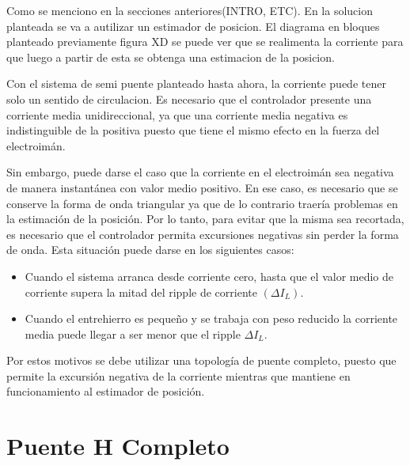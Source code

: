 Como se menciono en la secciones anteriores(INTRO, ETC). En la solucion planteada se va a autilizar un estimador de posicion. El diagrama en bloques planteado previamente figura XD se puede ver que se realimenta la corriente para que luego a partir de esta se obtenga una estimacion de la posicion.


Con el sistema de semi puente planteado hasta ahora, la corriente puede tener solo un sentido de circulacion. Es necesario que el controlador presente una corriente media unidireccional, ya que una corriente media negativa es indistinguible de la positiva puesto que tiene el mismo efecto en la fuerza del electroimán.%

Sin embargo, puede darse el caso que la corriente en el electroimán sea negativa de manera instantánea con valor medio positivo. En ese caso, es necesario que se conserve la forma de onda triangular ya que de lo contrario traería problemas en la estimación de la posición. Por lo tanto, para evitar que la misma sea recortada, es necesario que el controlador permita excursiones negativas sin perder la forma de onda. Esta situación puede darse en los siguientes casos:


\begin{itemize} 
	\item Cuando el sistema arranca desde corriente cero, hasta que el valor medio de corriente supera la mitad del ripple de corriente $(\Delta I_{L})$.
	
	\item Cuando el entrehierro es pequeño y se trabaja con peso reducido la corriente media puede llegar a ser menor que el ripple $\Delta I_{L}$.
\end{itemize}

\noindent Por estos motivos se debe utilizar una topología de puente completo, puesto que permite la excursión negativa de la corriente mientras que mantiene en funcionamiento al estimador de posición.



\section{Puente H Completo}

